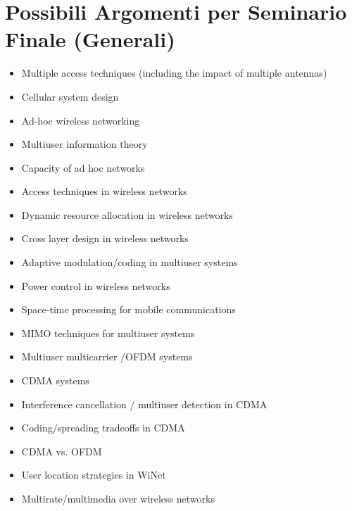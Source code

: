 \section*{Possibili Argomenti per Seminario Finale (Generali)}
\begin{itemize}
    \item Multiple access techniques (including the impact of multiple antennas)
    \item Cellular system design
    \item Ad-hoc wireless networking
    \item Multiuser information theory
    \item Capacity of ad hoc networks
    \item Access techniques in wireless networks
    \item Dynamic resource allocation in wireless networks
    \item Cross layer design in wireless networks
    \item Adaptive modulation/coding in multiuser systems
    \item Power control in wireless networks
    \item Space-time processing for mobile communications
    \item MIMO techniques for multiuser systems
    \item Multiuser multicarrier /OFDM systems
    \item CDMA systems
    \item Interference cancellation / multiuser detection in CDMA
    \item Coding/spreading tradeoffs in CDMA
    \item CDMA vs. OFDM
    \item User location strategies in WiNet
    \item Multirate/multimedia over wireless networks
\end{itemize}

